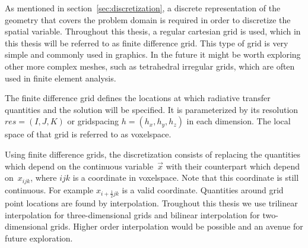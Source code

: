As mentioned in section~\ref{sec:discretization}, a discrete representation of the geometry that covers the problem domain is required in order to discretize the spatial variable. Throughout this thesis, a regular cartesian grid is used, which in this thesis will be referred to as finite difference grid. This type of grid is very simple and commonly used in graphics. In the future it might be worth exploring other more complex meshes, such as tetrahedral irregular grids, which are often used in finite element analysis. 

The finite difference grid defines the locations at which radiative transfer quantities and the solution will be specified. It is parameterized by its resolution $res=(I,J,K)$ or gridspacing $h=(h_x, h_y, h_z)$ in each dimension. The local space of that grid is referred to as voxelspace.

Using finite difference grids, the discretization consists of replacing the quantities which depend on the continuous variable~$\vec{x}$ with their counterpart which depend on~$x_{ijk}$, where $ijk$ is a coordinate in voxelspace. Note that this coordinate is still continuous. For example $x_{i+\frac{1}{2}jk}$ is a valid coordinate. Quantities around grid point locations are found by interpolation. Troughout this thesis we use trilinear interpolation for three-dimensional grids and bilinear interpolation for two-dimensional grids. Higher order interpolation would be possible and an avenue for future exploration.

